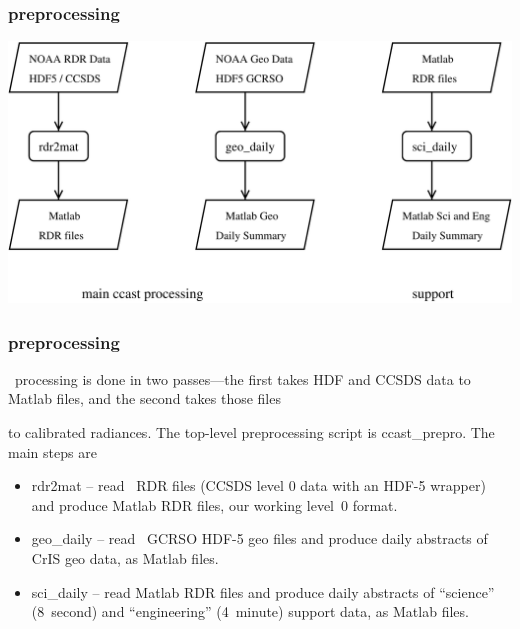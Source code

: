 \documentclass[11pt]{beamer}
\begin{document}
\begin{frame}
\frametitle{preprocessing}

\begin{center}
  \includegraphics[scale=0.4]{figures/prepro.pdf}
\end{center}

\end{frame}
\begin{frame}
\frametitle{preprocessing}

\ccast\ processing is done in two passes---the first takes HDF 
and CCSDS data to Matlab files, and the second takes those files 

to calibrated radiances.  The top-level preprocessing  script is
ccast\_prepro.  The main steps are

\begin{itemize}
  \item rdr2mat -- read \noaa\ RDR files (CCSDS level 0 data with an
    HDF-5 wrapper) and produce Matlab RDR files, our working level~0
    format.

  \item geo\_daily -- read \noaa\ GCRSO HDF-5 geo files and produce
    daily abstracts of CrIS geo data, as Matlab files.

  \item sci\_daily -- read Matlab RDR files and produce daily
    abstracts of ``science'' (8~second) and ``engineering''
    (4~minute) support data, as Matlab files.

\end{itemize}

\end{frame}
\end{document}

